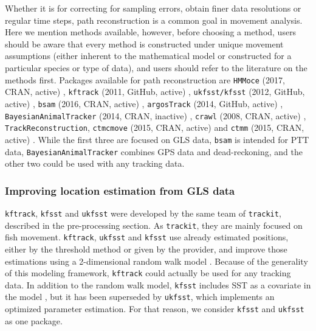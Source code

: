 \documentclass[a4paper,12pt]{article}
\newcommand{\Rpkg}[1]{\texttt{#1}}
\begin{document}
	Whether it is for correcting for sampling errors, obtain finer data resolutions or regular time steps, path reconstruction is a common goal in movement analysis. Here we mention methods available, however, before choosing a method, users should be aware that every method is constructed under unique movement assumptions (either inherent to the mathematical model or constructed for a particular species or type of data), and users should refer to the literature on the methods first. Packages available for path reconstruction are \Rpkg{HMMoce} (2017, CRAN, active) \citep{Braun2017}, \Rpkg{kftrack} (2011, GitHub, active) \citep{Rkftrack}, \Rpkg{ukfsst/kfsst} (2012, GitHub, active) \citep{Rukfsst}, \Rpkg{bsam} (2016, CRAN, active) \citep{Jonsen2005,Jonsen2016}, \Rpkg{argosTrack} (2014, GitHub, active) \citep{RargosTrack,Albertsen2015}, \Rpkg{BayesianAnimalTracker} (2014, CRAN, inactive) \citep{RBayesianAnimalTracker}, \Rpkg{crawl} (2008, CRAN, active) \citep{Rcrawl,Johnson2008}, \Rpkg{TrackReconstruction}, \Rpkg{ctmcmove} (2015, CRAN, active) \citep{Rctmcmove} and \Rpkg{ctmm} (2015, CRAN, active) \citep{Rctmm}. While the first three are focused on GLS data, \Rpkg{bsam} is intended for PTT data, \Rpkg{BayesianAnimalTracker} combines GPS data and dead-reckoning, and the other two could be used with any tracking data.
	
	\subsubsection*{Improving location estimation from GLS data}
	
	\Rpkg{kftrack}, \Rpkg{kfsst} and \Rpkg{ukfsst} were developed by the same team of \Rpkg{trackit}, described in the pre-processing section. As \Rpkg{trackit}, they are mainly focused on fish movement. \Rpkg{kftrack}, \Rpkg{ukfsst} and \Rpkg{kfsst} use already estimated positions, either by the threshold method or given by the provider, and improve those estimations using a 2-dimensional random walk model \citep{Sibert2003}. Because of the generality of this modeling framework, \Rpkg{kftrack} could actually be used for any tracking data. In addition to the random walk model, \Rpkg{kfsst} includes SST as a covariate in the model \citep{Nielsen2006}, but it has been superseded by \Rpkg{ukfsst}, which implements an optimized parameter estimation. For that reason, we consider \Rpkg{kfsst} and \Rpkg{ukfsst} as one package.
	
\end{document}
